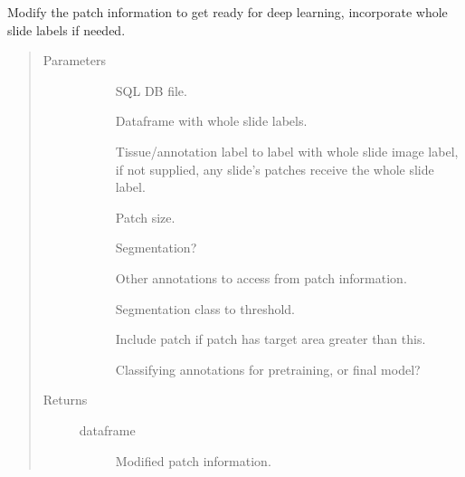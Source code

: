 \documentclass[letterpaper,10pt,english]{sphinxmanual}
\begin{document}
\begin{fulllineitems}
Modify the patch information to get ready for deep learning, incorporate whole slide labels if needed.
\begin{quote}\begin{description}
\item[{Parameters}] \leavevmode\begin{description}
\item[{}] \leavevmode
SQL DB file.

\item[{}] \leavevmode
Dataframe with whole slide labels.

\item[{}] \leavevmode
Tissue/annotation label to label with whole slide image label, if not supplied, any slide’s patches receive the whole slide label.

\item[{}] \leavevmode
Patch size.

\item[{}] \leavevmode
Segmentation?

\item[{}] \leavevmode
Other annotations to access from patch information.

\item[{}] \leavevmode
Segmentation class to threshold.

\item[{}] \leavevmode
Include patch if patch has target area greater than this.

\item[{}] \leavevmode
Classifying annotations for pretraining, or final model?

\end{description}

\item[{Returns}] \leavevmode\begin{description}
\item[{dataframe}] \leavevmode
Modified patch information.

\end{description}

\end{description}\end{quote}

\end{fulllineitems}
\end{document}
